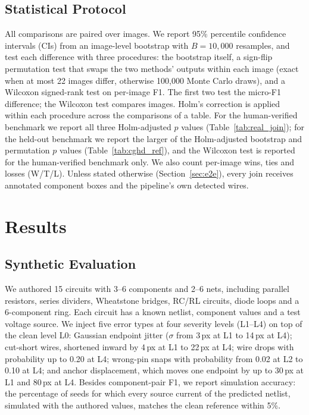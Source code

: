 \documentclass{ieeeaccess}
\begin{document}
\subsection{Statistical Protocol}

All comparisons are paired over images. We report 95\% percentile confidence intervals (CIs) from an image-level bootstrap with $B=10{,}000$ resamples, and test each difference with three procedures: the bootstrap itself, a sign-flip permutation test that swaps the two methods' outputs within each image (exact when at most 22 images differ, otherwise 100{,}000 Monte Carlo draws), and a Wilcoxon signed-rank test on per-image F1. The first two test the micro-F1 difference; the Wilcoxon test compares images. Holm's correction is applied within each procedure across the comparisons of a table. For the human-verified benchmark we report all three Holm-adjusted $p$ values (Table~\ref{tab:real_join}); for the held-out benchmark we report the larger of the Holm-adjusted bootstrap and permutation $p$ values (Table~\ref{tab:cghd_ref}), and the Wilcoxon test is reported for the human-verified benchmark only. We also count per-image wins, ties and losses (W/T/L). Unless stated otherwise (Section~\ref{sec:e2e}), every join receives annotated component boxes and the pipeline's own detected wires.

\section{Results}
\label{sec:results}

\subsection{Synthetic Evaluation}
\label{sec:synthetic}

We authored 15 circuits with 3--6 components and 2--6 nets, including parallel resistors, series dividers, Wheatstone bridges, RC/RL circuits, diode loops and a 6-component ring. Each circuit has a known netlist, component values and a test voltage source. We inject five error types at four severity levels (L1--L4) on top of the clean level L0: Gaussian endpoint jitter ($\sigma$ from 3\,px at L1 to 14\,px at L4); cut-short wires, shortened inward by 4\,px at L1 to 22\,px at L4; wire drops with probability up to 0.20 at L4; wrong-pin snaps with probability from 0.02 at L2 to 0.10 at L4; and anchor displacement, which moves one endpoint by up to 30\,px at L1 and 80\,px at L4. Besides component-pair F1, we report simulation accuracy: the percentage of seeds for which every source current of the predicted netlist, simulated with the authored values, matches the clean reference within 5\%.
\end{document}
